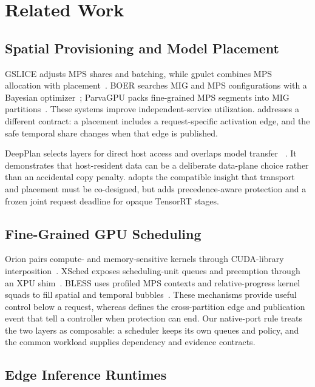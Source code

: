 \section{Related Work}
\label{sec:related}

\subsection{Spatial Provisioning and Model Placement}

GSLICE adjusts MPS shares and batching, while gpulet combines MPS allocation
with placement~\cite{gslice2020,gpulet2022}.  BOER searches MIG and MPS
configurations with a Bayesian optimizer~\cite{boer2025}; ParvaGPU packs
fine-grained MPS segments into MIG partitions~\cite{parvagpu2024}.  These
systems improve independent-service utilization.  \sys addresses a different
contract: a placement includes a request-specific activation edge, and the
safe temporal share changes when that edge is published.

DeepPlan selects layers for direct host access and overlaps model transfer
~\cite{deepplan2023}.  It demonstrates that host-resident data can be a
deliberate data-plane choice rather than an accidental copy penalty.  \sys
adopts the compatible insight that transport and placement
must be co-designed, but adds precedence-aware protection and a frozen joint
request deadline for opaque TensorRT stages.

\subsection{Fine-Grained GPU Scheduling}

Orion pairs compute- and memory-sensitive kernels through CUDA-library
interposition~\cite{orion2024}.  XSched exposes scheduling-unit queues and
preemption through an XPU shim~\cite{xsched2025}.  BLESS uses profiled MPS
contexts and relative-progress kernel squads to fill spatial and temporal
bubbles~\cite{bless2025}.  These mechanisms provide useful control below a
request, whereas \sys defines the cross-partition edge and publication event
that tell a controller when protection can end.  Our native-port rule treats
the two layers as composable: a scheduler keeps its own queues and policy, and
the common workload supplies dependency and evidence contracts.

\subsection{Edge Inference Runtimes}

